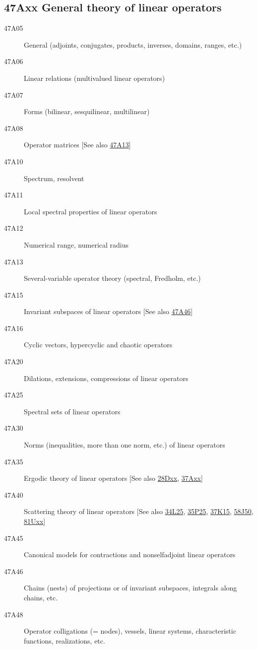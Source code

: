 \documentclass[letterpaper]{article}
\begin{document}
\subsection*{47Axx  General theory of linear operators }\label{47Axx}
\begin{description}  
\item [47A05]\label{47A05} General (adjoints, conjugates, products, inverses, domains, ranges, etc.)
\item [47A06]\label{47A06} Linear relations (multivalued linear operators)
\item [47A07]\label{47A07} Forms (bilinear, sesquilinear, multilinear)
\item [47A08]\label{47A08} Operator matrices [See also \hyperref[47A13]{47A13}]
\item [47A10]\label{47A10} Spectrum, resolvent
\item [47A11]\label{47A11} Local spectral properties of linear operators
\item [47A12]\label{47A12} Numerical range, numerical radius
\item [47A13]\label{47A13} Several-variable operator theory (spectral, Fredholm, etc.)
\item [47A15]\label{47A15} Invariant subspaces of linear operators [See also \hyperref[47A46]{47A46}]
\item [47A16]\label{47A16} Cyclic vectors, hypercyclic and chaotic operators
\item [47A20]\label{47A20} Dilations, extensions, compressions of linear operators
\item [47A25]\label{47A25} Spectral sets of linear operators
\item [47A30]\label{47A30} Norms (inequalities, more than one norm, etc.) of linear operators
\item [47A35]\label{47A35} Ergodic theory of linear operators [See also \hyperref[28Dxx]{28Dxx}, \hyperref[37Axx]{37Axx}]
\item [47A40]\label{47A40} Scattering theory of linear operators [See also \hyperref[34L25]{34L25}, \hyperref[35P25]{35P25}, \hyperref[37K15]{37K15}, \hyperref[58J50]{58J50}, \hyperref[81Uxx]{81Uxx}]
\item [47A45]\label{47A45} Canonical models for contractions and nonselfadjoint linear operators
\item [47A46]\label{47A46} Chains (nests) of projections or of invariant subspaces, integrals along chains, etc.
\item [47A48]\label{47A48} Operator colligations (= nodes), vessels, linear systems, characteristic functions, realizations, etc.

\end{description}
\end{document}
